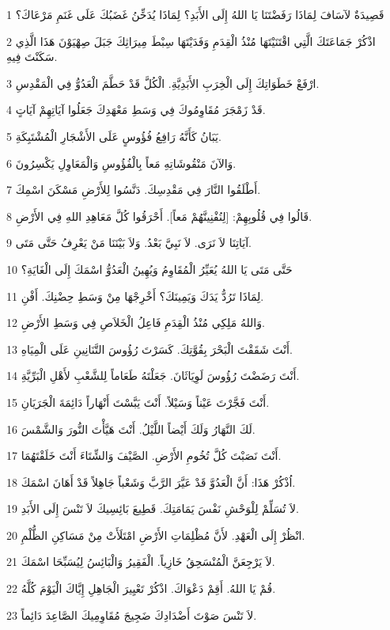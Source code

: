 \par 1 قَصِيدَةٌ لآسَافَ لِمَاذَا رَفَضْتَنَا يَا اللهُ إِلَى الأَبَدِ؟ لِمَاذَا يُدَخِّنُ غَضَبُكَ عَلَى غَنَمِ مَرْعَاكَ؟
\par 2 اذْكُرْ جَمَاعَتَكَ الَّتِي اقْتَنَيْتَهَا مُنْذُ الْقِدَمِ وَفَدَيْتَهَا سِبْطَ مِيرَاثِكَ جَبَلَ صِهْيَوْنَ هَذَا الَّذِي سَكَنْتَ فِيهِ.
\par 3 ارْفَعْ خَطَوَاتِكَ إِلَى الْخِرَبِ الأَبَدِيَّةِ. الْكُلَّ قَدْ حَطَّمَ الْعَدُوُّ فِي الْمَقْدِسِ.
\par 4 قَدْ زَمْجَرَ مُقَاوِمُوكَ فِي وَسَطِ مَعْهَدِكَ جَعَلُوا آيَاتِهِمْ آيَاتٍ.
\par 5 يَبَانُ كَأَنَّهُ رَافِعُ فُؤُوسٍ عَلَى الأَشْجَارِ الْمُشْتَبِكَةِ.
\par 6 وَالآنَ مَنْقُوشَاتِهِ مَعاً بِالْفُؤُوسِ وَالْمَعَاوِلِ يَكْسِرُونَ.
\par 7 أَطْلَقُوا النَّارَ فِي مَقْدِسِكَ. دَنَّسُوا لِلأَرْضِ مَسْكَنَ اسْمِكَ.
\par 8 قَالُوا فِي قُلُوبِهِمْ: [لِنُفْنِينَّهُمْ مَعاً]. أَحْرَقُوا كُلَّ مَعَاهِدِ اللهِ فِي الأَرْضِ.
\par 9 آيَاتِنَا لاَ نَرَى. لاَ نَبِيَّ بَعْدُ. وَلاَ بَيْنَنَا مَنْ يَعْرِفُ حَتَّى مَتَى.
\par 10 حَتَّى مَتَى يَا اللهُ يُعَيِّرُ الْمُقَاوِمُ وَيُهِينُ الْعَدُوُّ اسْمَكَ إِلَى الْغَايَةِ؟
\par 11 لِمَاذَا تَرُدُّ يَدَكَ وَيَمِينَكَ؟ أَخْرِجْهَا مِنْ وَسَطِ حِضْنِكَ. أَفْنِ.
\par 12 وَاللهُ مَلِكِي مُنْذُ الْقِدَمِ فَاعِلُ الْخَلاَصِ فِي وَسَطِ الأَرْضِ.
\par 13 أَنْتَ شَقَقْتَ الْبَحْرَ بِقُوَّتِكَ. كَسَرْتَ رُؤُوسَ التَّنَانِينِ عَلَى الْمِيَاهِ.
\par 14 أَنْتَ رَضَضْتَ رُؤُوسَ لَوِيَاثَانَ. جَعَلْتَهُ طَعَاماً لِلشَّعْبِ لأَهْلِ الْبَرِّيَّةِ.
\par 15 أَنْتَ فَجَّرْتَ عَيْناً وَسَيْلاً. أَنْتَ يَبَّسْتَ أَنْهَاراً دَائِمَةَ الْجَرَيَانِ.
\par 16 لَكَ النَّهَارُ وَلَكَ أَيْضاً اللَّيْلُ. أَنْتَ هَيَّأْتَ النُّورَ وَالشَّمْسَ.
\par 17 أَنْتَ نَصَبْتَ كُلَّ تُخُومِ الأَرْضِ. الصَّيْفَ وَالشِّتَاءَ أَنْتَ خَلَقْتَهُمَا.
\par 18 اُذْكُرْ هَذَا: أَنَّ الْعَدُوَّ قَدْ عَيَّرَ الرَّبَّ وَشَعْباً جَاهِلاً قَدْ أَهَانَ اسْمَكَ.
\par 19 لاَ تُسَلِّمْ لِلْوَحْشِ نَفْسَ يَمَامَتِكَ. قَطِيعَ بَائِسِيكَ لاَ تَنْسَ إِلَى الأَبَدِ.
\par 20 انْظُرْ إِلَى الْعَهْدِ. لأَنَّ مُظْلِمَاتِ الأَرْضِ امْتَلَأَتْ مِنْ مَسَاكِنِ الظُّلْمِ.
\par 21 لاَ يَرْجِعَنَّ الْمُنْسَحِقُ خَازِياً. الْفَقِيرُ وَالْبَائِسُ لِيُسَبِّحَا اسْمَكَ.
\par 22 قُمْ يَا اللهُ. أَقِمْ دَعْوَاكَ. اذْكُرْ تَعْيِيرَ الْجَاهِلِ إِيَّاكَ الْيَوْمَ كُلَّهُ.
\par 23 لاَ تَنْسَ صَوْتَ أَضْدَادِكَ ضَجِيجَ مُقَاوِمِيكَ الصَّاعِدَ دَائِماً.

